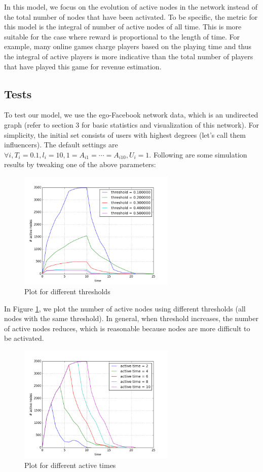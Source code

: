 \documentclass{article}
\begin{document}
In this model, we focus on the evolution of active nodes in the network instead of the total number of nodes that have been activated. To be specific, the metric for this model is the integral of number of active nodes of all time. This is more suitable for the case where reward is proportional to the length of time. For example, many online games charge players based on the playing time and thus the integral of active players is more indicative than the total number of players that have played this game for revenue estimation.

\subsection{Tests}

To test our model, we use the ego-Facebook network data, which is an undirected graph (refer to section 3 for basic statistics and visualization of this network). For simplicity, the initial set consists of users with highest degrees (let's call them influencers). The default settings are $\forall i, T_i = 0.1, l_i = 10, 1 = A_{i1} = \cdots = A_{i10}, U_i = 1$. Following are some simulation results by tweaking one of the above parameters:

\begin{figure}[!htbp]
\centering
\includegraphics[width=7.5cm]{yzplot1.png}
\caption{Plot for different thresholds}
\label{threshold}
\end{figure}

In Figure \ref{threshold}, we plot the number of active nodes using different thresholds (all nodes with the same threshold). In general, when threshold increases, the number of active nodes reduces, which is reasonable because nodes are more difficult to be activated.

\begin{figure}[!htbp]
\centering
\includegraphics[width=7.5cm]{yzplot2.png}
\caption{Plot for different active times}
\label{activelength}
\end{figure}
\end{document}
